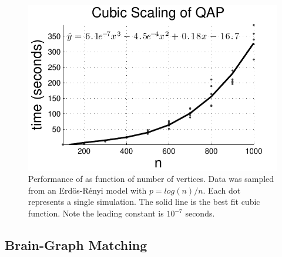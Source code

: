 \documentclass[10pt,journal,cspaper,compsoc]{IEEEtran}
\begin{document}
\begin{figure}[htbp]
	\centering			
	\includegraphics[width=1.0\linewidth]{../figs/digraph_qap2}
	\caption{Performance of \rqap as function of number of vertices. Data was sampled from an Erd\"os-R\'enyi model with $p=log(n)/n$.  Each dot represents a single simulation.  The solid line is the best fit cubic function.  Note the leading constant is $10^{-7}$ seconds. }
	\label{fig:scaling}
\end{figure}



\subsection{Brain-Graph Matching} %
\label{sub:connectome_classification}
\end{document}
